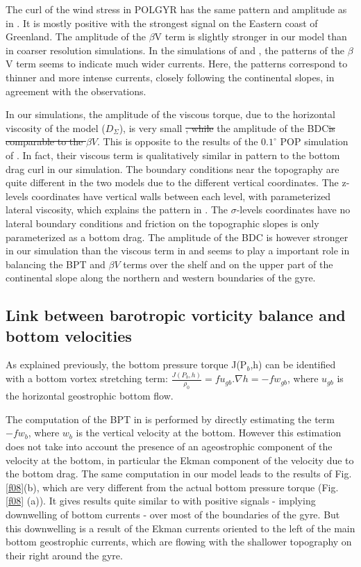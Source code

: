\documentclass[os, manuscript]{copernicus}
\providecommand{\DIFadd}[1]{{\protect\color{blue}\uwave{#1}}} %
\providecommand{\DIFdel}[1]{{\protect\color{red}\sout{#1}}}                      %
\providecommand{\DIFaddbegin}{} %
\providecommand{\DIFaddend}{} %
\providecommand{\DIFdelbegin}{} %
\providecommand{\DIFdelend}{} %
\begin{document}
The curl of the wind stress in POLGYR has the same pattern and amplitude as in \citet{yeager2015}. It is mostly positive with the strongest signal on the Eastern coast of Greenland. The amplitude of the $\beta$V term is slightly stronger in our model than in coarser resolution simulations. In the simulations of \citet{hughes2001} and \citet{yeager2015}, the patterns of the $\beta$V term seems to indicate much wider currents. Here, the patterns correspond to thinner and more intense currents, closely following the continental slopes, in agreement with the observations.

In our simulations, the amplitude of the viscous torque, due to the horizontal viscosity of the model ($D_{\Sigma}$), is very small \DIFdelbegin \DIFdel{, while }\DIFdelend \DIFaddbegin \DIFadd{compared }\DIFaddend the amplitude of the BDC\DIFdelbegin \DIFdel{is comparable to the $\beta V$}\DIFdelend . This is opposite to the results of the $0.1^{\circ}$ POP simulation of \citet{yeager2015}. In fact, their viscous term is qualitatively similar in pattern to the bottom drag curl in our simulation. The boundary conditions near the topography are quite different in the two models due to the different vertical coordinates. The z-levels coordinates have vertical walls between each level, with parameterized lateral viscosity, which explains the pattern in \citet{yeager2015}. The $\sigma$-levels coordinates have no lateral boundary conditions and friction on the topographic slopes is only parameterized as a bottom drag. The amplitude of the BDC is however stronger in our simulation than the viscous term in \citet{yeager2015} and seems to play a important role in balancing the BPT and $\beta V$ terms over the shelf and on the upper part of the continental slope along the northern and western boundaries of the gyre.

\subsection{Link between barotropic vorticity balance and bottom velocities}

As explained previously, the bottom pressure torque J(P$_b$,h) can be identified with a bottom vortex stretching term: $\frac{J(P_b,h)}{\rho _0}=f u_{gb}.\nabla h = -f w_{gb}$, where $u_{gb}$ is the horizontal geostrophic bottom flow. 

The computation of the BPT in \citet{spence2012} is performed by directly estimating the term  $-f w_{b}$, where $w_{b}$ is the vertical velocity at the bottom. However this estimation does not take into account the presence of an ageostrophic component of the velocity at the bottom, in particular the Ekman component of the velocity due to the bottom drag. The same computation in our model leads to the results of Fig. \ref{f08}(b), which are very different from the actual bottom pressure torque (Fig. \ref{f08} (a)). It gives results quite similar to \citet{spence2012} with positive signals - implying downwelling of bottom currents - over most of the boundaries of the gyre. But this downwelling is a result of the Ekman currents oriented to the left of the main bottom geostrophic currents, which are flowing with the shallower topography on their right around the gyre.
\end{document}
